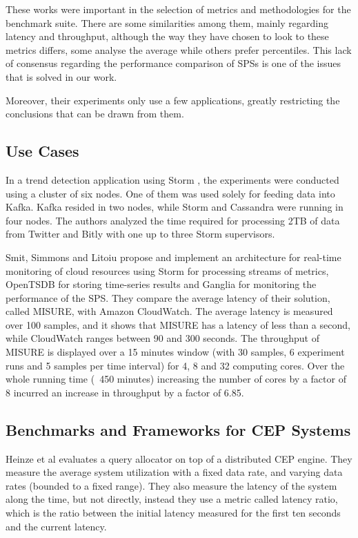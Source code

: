 \documentclass[ppgc,diss,english]{iiufrgs}
\begin{document}
These works were important in the selection of metrics and methodologies for the benchmark suite. There are some similarities among them, mainly regarding latency and throughput, although the way they have chosen to look to these metrics differs, some analyse the average while others prefer percentiles. This lack of consensus regarding the performance comparison of SPSs is one of the issues that is solved in our work.

Moreover, their experiments only use a few applications, greatly restricting the conclusions that can be drawn from them.


\subsection{Use Cases}

In a trend detection application using Storm \cite{chardonnens2013big}, the experiments were conducted using a cluster of six nodes. One of them was used solely for feeding data into Kafka. Kafka resided in two nodes, while Storm and Cassandra were running in four nodes. The authors analyzed the time required for processing 2TB of data from Twitter and Bitly with one up to three Storm supervisors.

Smit, Simmons and Litoiu \cite{smit2013distributed} propose and implement an architecture for real-time monitoring of cloud resources using Storm for processing streams of metrics, OpenTSDB for storing time-series results and Ganglia for monitoring the performance of the SPS. They compare the average latency of their solution, called MISURE, with Amazon CloudWatch. The average latency is measured over 100 samples, and it shows that MISURE has a latency of less than a second, while CloudWatch ranges between 90 and 300 seconds. The throughput of MISURE is displayed over a 15 minutes window (with 30 samples, 6 experiment runs and 5 samples per time interval) for 4, 8 and 32 computing cores. Over the whole running time (~450 minutes) increasing the number of cores by a factor of 8 incurred an increase in throughput by a factor of 6.85.


\subsection{Benchmarks and Frameworks for CEP Systems}

Heinze et al \cite{heinzeelastic} evaluates a query allocator on top of a distributed CEP engine. They measure the average system utilization with a fixed data rate, and varying data rates (bounded to a fixed range). They also measure the latency of the system along the time, but not directly, instead they use a metric called latency ratio, which is the ratio between the initial latency measured for the first ten seconds and the current latency.
\end{document}
